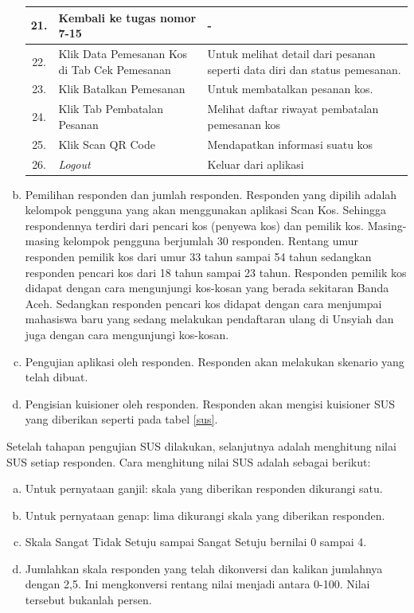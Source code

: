 \begin{enumerate}[a.]
\begin{longtable}{ |c|p{5cm}|p{7cm}| }
			\hline
			21. & Kembali ke tugas nomor 7-15 & - \\
			\hline
			22. & Klik Data Pemesanan Kos di Tab Cek Pemesanan & Untuk melihat detail dari pesanan seperti data diri dan status pemesanan. \\
			\hline
			23. & Klik Batalkan Pemesanan & Untuk membatalkan pesanan kos. \\ 
			\hline
			24. & Klik Tab Pembatalan Pesanan & Melihat daftar riwayat pembatalan pemesanan kos \\
			\hline
			25. & Klik Scan QR Code	& Mendapatkan informasi suatu kos \\
			\hline
			26. & \textit{Logout} & Keluar dari aplikasi \\ 
			\hline
		\end{longtable}
		\item Pemilihan responden dan jumlah responden. Responden yang dipilih adalah kelompok pengguna yang akan menggunakan aplikasi Scan Kos. Sehingga respondennya terdiri dari pencari kos (penyewa kos) dan pemilik kos. Masing-masing kelompok pengguna berjumlah 30 responden. Rentang umur responden pemilik kos dari umur 33 tahun sampai 54 tahun sedangkan responden pencari kos dari 18 tahun sampai 23 tahun. Responden pemilik kos didapat dengan cara mengunjungi kos-kosan yang berada sekitaran Banda Aceh. Sedangkan responden pencari kos didapat dengan cara menjumpai mahasiswa baru yang sedang melakukan pendaftaran ulang di Unsyiah dan juga dengan cara mengunjungi kos-kosan.
		\item Pengujian aplikasi oleh responden. Responden akan melakukan skenario yang telah dibuat.
		\item Pengisian kuisioner oleh responden. Responden akan mengisi kuisioner SUS yang diberikan seperti pada tabel \ref{sus}.
		
	\end{enumerate}
	
	Setelah tahapan pengujian SUS dilakukan, selanjutnya adalah menghitung nilai SUS setiap responden. Cara menghitung nilai SUS adalah sebagai berikut:
	\begin{enumerate}[a.]
		\item  Untuk pernyataan ganjil: skala yang diberikan responden dikurangi satu.
		\item Untuk pernyataan genap: lima dikurangi skala yang diberikan responden.
		\item Skala Sangat Tidak Setuju sampai Sangat Setuju bernilai 0 sampai 4.
		\item Jumlahkan skala responden yang telah dikonversi dan kalikan jumlahnya dengan 2,5. Ini mengkonversi rentang nilai menjadi antara 0-100. Nilai tersebut bukanlah persen.
	\end{enumerate} 

